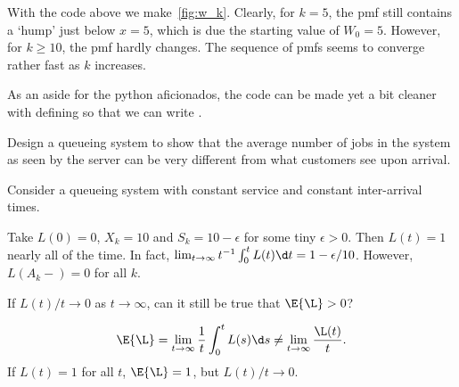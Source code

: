 With the code above we make~\cref{fig:w_k}.
Clearly, for $k=5$, the pmf still contains a `hump' just below $x=5$, which is due the starting value of $W_{0}=5$.
However, for $k\geq 10$, the pmf hardly changes.
The sequence of pmfs seems to converge rather fast as $k$ increases.

As an aside for the python aficionados, the code can be made yet a bit cleaner with defining   so that we can write 
.





\begin{exercise}\label{ex:l-165}
Design a queueing system to show that the average number of jobs in the system as seen by the server can be very different from what customers see upon arrival.
\begin{hint}
Consider a queueing system with constant service and constant inter-arrival times.
\end{hint}
\begin{solution}
 Take $L(0) = 0$, $X_k = 10$ and $S_k = 10-\epsilon$ for some tiny
 $\epsilon>0$. Then $L(t) = 1$ nearly all of the time. In fact,
 $\lim_{t\to\infty}t^{-1}\int_0^t L(t) \d t= 1-\epsilon/10$. However, $L(A_k-)=0$ for all $k$.
\end{solution}
\end{exercise}


\begin{exercise}\label{ex:90}
 If $L(t)/t \to 0$ as $t\to\infty$, can it still be true that $\E{\L}>0$? 
\begin{solution}
 \begin{equation*}
 \E{\L} = \lim_{t\to\infty} \frac 1 t \int_0^t L(s) \d s \neq \lim_{t\to\infty} \frac{\L(t)}t.
 \end{equation*}
If $L(t)=1$ for all $t$, $\E{\L} =1 $, but $L(t)/t \to 0$. 
\end{solution}
\end{exercise}


